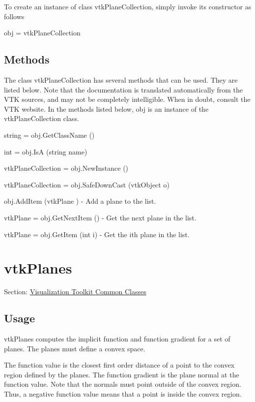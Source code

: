 To create an instance of class vtk\-Plane\-Collection, simply invoke its constructor as follows \begin{DoxyVerb}  obj = vtkPlaneCollection
\end{DoxyVerb}
 \hypertarget{vtkwidgets_vtkxyplotwidget_Methods}{}\subsection{Methods}\label{vtkwidgets_vtkxyplotwidget_Methods}
The class vtk\-Plane\-Collection has several methods that can be used. They are listed below. Note that the documentation is translated automatically from the V\-T\-K sources, and may not be completely intelligible. When in doubt, consult the V\-T\-K website. In the methods listed below, {\ttfamily obj} is an instance of the vtk\-Plane\-Collection class. 
\begin{DoxyItemize}
\item {\ttfamily string = obj.\-Get\-Class\-Name ()}  
\item {\ttfamily int = obj.\-Is\-A (string name)}  
\item {\ttfamily vtk\-Plane\-Collection = obj.\-New\-Instance ()}  
\item {\ttfamily vtk\-Plane\-Collection = obj.\-Safe\-Down\-Cast (vtk\-Object o)}  
\item {\ttfamily obj.\-Add\-Item (vtk\-Plane )} -\/ Add a plane to the list.  
\item {\ttfamily vtk\-Plane = obj.\-Get\-Next\-Item ()} -\/ Get the next plane in the list.  
\item {\ttfamily vtk\-Plane = obj.\-Get\-Item (int i)} -\/ Get the ith plane in the list.  
\end{DoxyItemize}\hypertarget{vtkcommon_vtkplanes}{}\section{vtk\-Planes}\label{vtkcommon_vtkplanes}
Section\-: \hyperlink{sec_vtkcommon}{Visualization Toolkit Common Classes} \hypertarget{vtkwidgets_vtkxyplotwidget_Usage}{}\subsection{Usage}\label{vtkwidgets_vtkxyplotwidget_Usage}
vtk\-Planes computes the implicit function and function gradient for a set of planes. The planes must define a convex space.

The function value is the closest first order distance of a point to the convex region defined by the planes. The function gradient is the plane normal at the function value. Note that the normals must point outside of the convex region. Thus, a negative function value means that a point is inside the convex region.

